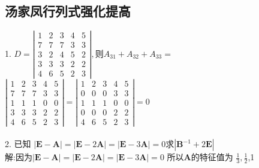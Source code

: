 \documentclass[a4paper,fleqn]{article}
\begin{document}
\subsection{汤家凤行列式强化提高}
1. $D=\left|\begin{array}{ccccc}{1} & {2} & {3} & {4} & {5} \\ {7} & {7} & {7} & {3} & {3} \\ {3} & {2} & {4} & {5} & {2} \\ {3} & {3} & {3} & {2} & {2} \\ {4} & {6} & {5} & {2} & {3}\end{array}\right|, \text {则} A_{31}+A_{32}+A_{33}=$ 
$\left|\begin{array}{ccccc}{1} & {2} & {3} & {4} & {5} \\ {7} & {7} & {7} & {3} & {3} \\ {1} & {1} & {1} & {0} & {0} \\ {3} & {3} & {3} & {2} & {2} \\ {4} & {6} & {5} & {2} & {3} \end{array}\right| = \left|\begin{array}{lllll}{1} & {2} & {3} & {4} & {5} \\ {0} & {0} & {0} & {3} & {3} \\ {1} & {1} & {1} & {0} & {0} \\ {0} & {0} & {0} & {2} & {2} \\ {4} & {6} & {5} & {2} & {3}\end{array}\right|=0$ \\ \\
2.
已知
$|\boldsymbol{E}-\boldsymbol{A}|=|\boldsymbol{E}-2 \boldsymbol{A}|=|\boldsymbol{E}-3 \boldsymbol{A}|=0$求$ \left|\boldsymbol{B}^{-1}+2 \boldsymbol{E}\right|$ \\ 
解:因为$|\boldsymbol{E}-\boldsymbol{A}|=|\boldsymbol{E}-2 \boldsymbol{A}|=|\boldsymbol{E}-3 \boldsymbol{A}|=0$
所以$\boldsymbol{A}$的特征值为 $\frac{1}{3},\frac{1}{2}$,1
\end{document}
